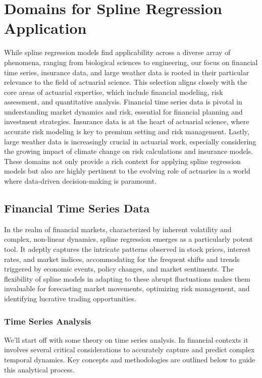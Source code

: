 \documentclass[12pt, twoside,hidelinks]{article}
\theoremstyle{definition}
\numberwithin{equation}{section}
\begin{document}
\section{Domains for Spline Regression Application}

While spline regression models find applicability across a diverse array of phenomena, ranging from biological sciences to engineering, our focus on financial time series, insurance data, and large weather data is rooted in their particular relevance to the field of actuarial science. This selection aligns closely with the core areas of actuarial expertise, which include financial modeling, risk assessment, and quantitative analysis. Financial time series data is pivotal in understanding market dynamics and risk, essential for financial planning and investment strategies. Insurance data is at the heart of actuarial science, where accurate risk modeling is key to premium setting and risk management. Lastly, large weather data is increasingly crucial in actuarial work, especially considering the growing impact of climate change on risk calculations and insurance models. These domains not only provide a rich context for applying spline regression models but also are highly pertinent to the evolving role of actuaries in a world where data-driven decision-making is paramount.


\subsection{Financial Time Series Data}
In the realm of financial markets, characterized by inherent volatility and complex, non-linear dynamics, spline regression emerges as a particularly potent tool. It adeptly captures the intricate patterns observed in stock prices, interest rates, and market indices, accommodating for the frequent shifts and trends triggered by economic events, policy changes, and market sentiments. The flexibility of spline models in adapting to these abrupt fluctuations makes them invaluable for forecasting market movements, optimizing risk management, and identifying lucrative trading opportunities.

\subsubsection{Time Series Analysis}

We'll start off with some theory on time series analysis. In financial contexts it involves several critical considerations to accurately capture and predict complex temporal dynamics. Key concepts and methodologies are outlined below to guide this analytical process.
\newline
\end{document}
